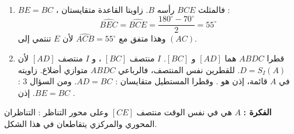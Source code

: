 \documentclass[12pt,a4paper]{article}
\begin{document}
\begin{corr}[title={تركيب : مثلث قائم ومناظراته}, stars=3, source={Axiomaths}]
\begin{enumerate}[itemsep=14pt]
  \[\widehat{EBC}=\widehat{EBA}+\widehat{ABC}=35^\circ+35^\circ=70^\circ\]
  \item $BE=BC$ ، فالمثلث $BCE$  رأسه $B$. زاويتا القاعدة متقايستان :
  \[\widehat{BEC}=\widehat{BCE}=\dfrac{180^\circ-70^\circ}{2}=55^\circ\]
  وهذا متفق مع $\widehat{ACB}=55^\circ$ لأن $E$ تنتمي إلى $(AC)$.
  \item قطرا $ABDC$ هما $[AD]$ و $[BC]$. $I$ منتصف $[BC]$ ، و $I$ منتصف $[AD]$ لأن $D=S_I(A)$. للقطرين نفس المنتصف، فالرباعي $ABDC$ متوازي أضلاع.
  زاويته في $A$ قائمة، إذن هو . وقطرا المستطيل متقايسان : $AD=BC$.
  ومن السؤال 3 : $BE=BC$. إذن .
\end{enumerate}
\textbf{الفكرة :} $A$ هي في نفس الوقت منتصف $[CE]$ وعلى محور التناظر : التناظران المحوري والمركزي يتقاطعان في هذا الشكل.
\end{corr}
\end{document}
